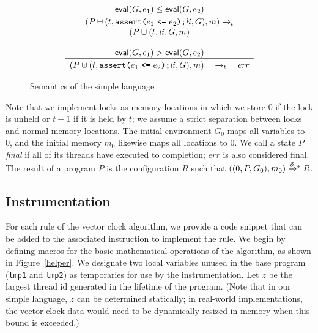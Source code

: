 \documentclass[preprint, 10pt]{sigplanconf}
\newcommand{\assert}[2]{\texttt{assert(}#1\ \texttt{<=}\ #2\texttt{)}}
\newcommand{\cfg}[2]{\ensuremath{(#1, #2)}}
\newcommand{\anarrow}[2]{\ensuremath{\xrightarrow{#2}_{#1}}}
\newcommand{\execstar}[4]{\ensuremath{\cfg{#1}{#2} \tto{#3} #4}}
\newcommand{\tto}[1]{\mathrel{
  \vphantom{\xrightarrow{#1}}
  \smash{\xrightarrow{#1}}
  \vphantom{\to}^{*}}
}
\begin{document}
\begin{figure}[tb]
\[\begin{array}{c}
\multicolumn{1}{c}{\mathsf{eval}(G, e_1) \le \mathsf{eval}(G, e_2)}
\\ \hline \rule{0pt}{2.5ex}
\cfg{P \uplus (t, \assert{e_1}{e_2}\texttt{;} \mathit{li}, G)}{m}
\anarrow{t}{} \\
\cfg{P \uplus (t, \mathit{li}, G}{m}
\\\\

\multicolumn{1}{c}{\mathsf{eval}(G, e_1) > \mathsf{eval}(G, e_2)}
\\ \hline \rule{0pt}{2.5ex}
\cfg{P \uplus (t, \assert{e_1}{e_2}\texttt{;} \mathit{li}, G)}{m}
\quad \anarrow{t}{} \quad
\mathit{err}
\end{array}
\]







\caption{Semantics of the simple language}
\label{semantics}
\end{figure}
Note that we implement locks as memory locations in which we store 0 if the lock is unheld or $t + 1$ if it is held by $t$; we assume a strict separation between locks and normal memory locations. The initial environment $G_0$ maps all variables to 0, and the initial memory $m_0$ likewise maps all locations to 0. We call a state $P$ \emph{final} if all of its threads have executed to completion; $\mathit{err}$ is also considered final. The result of a program $P$ is the configuration $R$ such that \execstar{(0, P, G_0)}{m_0}{\vec{o}}{R}.

\subsection{Instrumentation}
For each rule of the vector clock algorithm, we provide a code snippet that can be added to the associated instruction to implement the rule. We begin by defining macros for the basic mathematical operations of the algorithm, as shown in Figure~\ref{helper}. We designate two local variables unused in the base program (\texttt{tmp1} and \texttt{tmp2}) as temporaries for use by the instrumentation. Let $z$ be the largest thread id generated in the lifetime of the program. (Note that in our simple language, $z$ can be determined statically; in real-world implementations, the vector clock data would need to be dynamically resized in memory when this bound is exceeded.)
\end{document}
